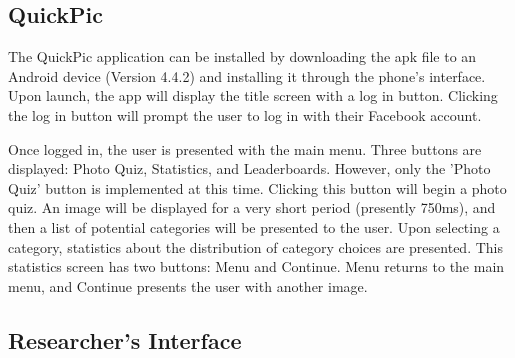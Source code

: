 \documentclass{article}
\begin{document}
\subsection{QuickPic}

The QuickPic application can be installed by downloading the apk file to an
Android device (Version 4.4.2) and installing it through the phone's
interface. Upon launch, the app will display the title screen with a log in
button. Clicking the log in button will prompt the user to log in with their
Facebook account.

Once logged in, the user is presented with the main menu. Three buttons are
displayed: Photo Quiz, Statistics, and Leaderboards. However, only the 'Photo
Quiz' button is implemented at this time. Clicking this button will begin a
photo quiz. An image will be displayed for a very short period (presently
750ms), and then a list of potential categories will be presented to the
user. Upon selecting a category, statistics about the distribution of category
choices are presented. This statistics screen has two buttons: Menu and
Continue. Menu returns to the main menu, and Continue presents the user with
another image.

\subsection{Researcher's Interface}
\end{document}
